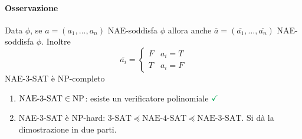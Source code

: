 \paragraph{Osservazione} Data $\phi$, se $a=(a_1,\dots,a_n)$ NAE-soddisfa $\phi$ allora anche $\overline{a}=(\overline{a_1},\dots,\overline{a_n})$ NAE-soddisfa $\phi$. Inoltre \begin{equation*}
	\overline{a_i}=\begin{cases}
		F & a_i=T\\ T & a_i=F
		\end{cases}
\end{equation*}
NAE-3-SAT è NP-completo
\begin{enumerate}
	\item $\text{NAE-3-SAT}\in \text{NP}$: esiste un verificatore polinomiale $\color{Green}\checkmark$
	\item NAE-3-SAT è NP-hard: $\text{3-SAT}\preceq\text{NAE-4-SAT}\preceq\text{NAE-3-SAT}$. Si dà la dimostrazione in due parti.
\end{enumerate}
